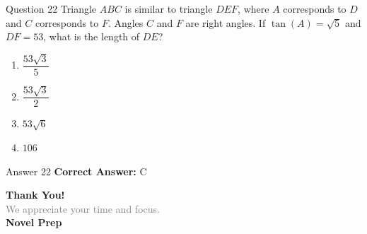 \documentclass{beamer}
\begin{document}
\begin{frame}{Question 22}
\small
Triangle $ABC$ is similar to triangle $DEF$, where $A$ corresponds to $D$ and $C$ corresponds to $F$.  
Angles $C$ and $F$ are right angles.  
If $\tan(A) = \sqrt{5}$ and $DF = 53$, what is the length of $DE$?
\vspace{0.35cm}
\begin{enumerate}
    \item[A.] $\dfrac{53\sqrt{3}}{5}$
    \item[B.] $\dfrac{53\sqrt{3}}{2}$
    \item[C.] $53\sqrt{6}$
    \item[D.] $106$
\end{enumerate}
\end{frame}
\begin{frame}{Answer 22}
\small
\textbf{Correct Answer:} C
\end{frame}

\begin{frame}{}
    \centering
    \vspace{5em}
    {\Huge \textbf{\textcolor{novelPurple}{Thank You!}}} \\[1em]
    {\large \textcolor{gray}{We appreciate your time and focus.}} \\[3em]
    {\LARGE \textbf{\textcolor{novelPurple}{\textsf{Novel Prep}}}}
    \vfill
\end{frame}
\end{document}
